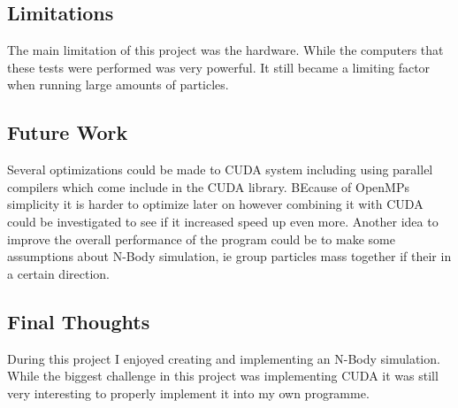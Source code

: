 \documentclass[12pt]{article}
\begin{document}
\subsection{Limitations}
The main limitation of this project was the hardware. While the computers that these tests were performed was very powerful. It still became a limiting factor when running large amounts of particles.
\subsection{Future Work}
Several optimizations could be made to CUDA system including using parallel compilers which come include in the CUDA library. BEcause of OpenMPs simplicity it is harder to optimize later on however combining it with CUDA could be investigated to see if it increased speed up even more. Another idea to improve the overall performance of the program could be to make some assumptions about N-Body simulation, ie group particles mass together if their in a certain direction. 
\subsection{Final Thoughts}
During this project I enjoyed creating and implementing an N-Body simulation. While the biggest challenge in this project was implementing CUDA it was still very interesting to properly implement it into my own programme.

	
\end{document}
